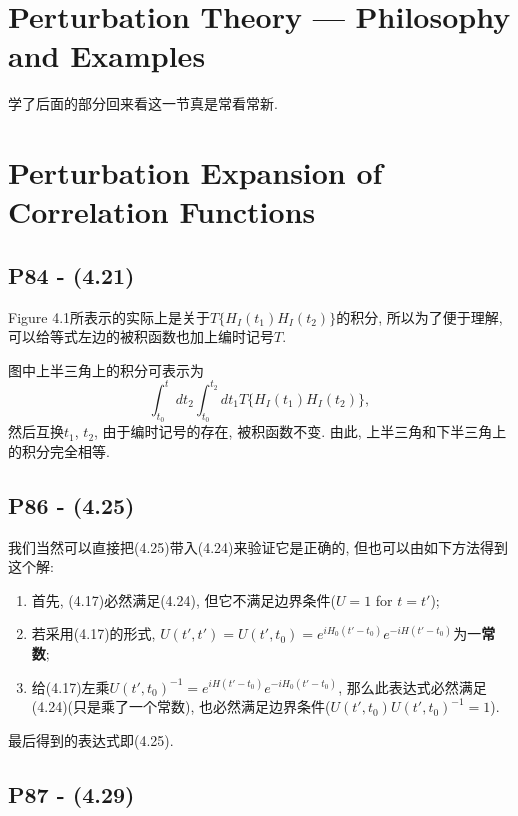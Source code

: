 \section{Perturbation Theory --- Philosophy and Examples}

学了后面的部分回来看这一节真是常看常新.

\section{Perturbation Expansion of Correlation Functions}

\subsection{P84 - (4.21)}

Figure 4.1所表示的实际上是关于$T\{H_I(t_1) H_I(t_2)\}$的积分, 所以为了便于理解, 可以给等式左边的被积函数也加上编时记号$T$.

图中上半三角上的积分可表示为
\begin{equation}
  \int_{t_0}^{t} dt_2 \int_{t_0}^{t_2} dt_1 T\{H_I(t_1) H_I(t_2)\},
\end{equation}
然后互换$t_1$, $t_2$, 由于编时记号的存在, 被积函数不变.
由此, 上半三角和下半三角上的积分完全相等.


\subsection{P86 - (4.25)}

我们当然可以直接把(4.25)带入(4.24)来验证它是正确的, 但也可以由如下方法得到这个解:
\begin{enumerate}
  \item 首先, (4.17)必然满足(4.24), 但它不满足边界条件($U = 1$ for $t = t'$);
  \item 若采用(4.17)的形式, $U(t', t') = U(t', t_0) = e^{iH_0(t'-t_0)}e^{-iH(t'-t_0)}$为一\textbf{常数};
  \item 给(4.17)左乘$U(t', t_0)^{-1} = e^{iH(t'-t_0)}e^{-iH_0(t'-t_0)}$, 那么此表达式必然满足(4.24)(只是乘了一个常数), 也必然满足边界条件($U(t', t_0)U(t', t_0)^{-1} = 1$).
\end{enumerate}
最后得到的表达式即(4.25).

\subsection{P87 - (4.29)}

